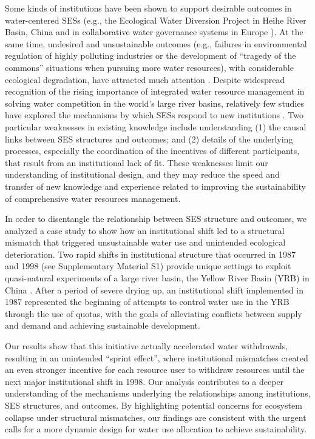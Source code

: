 \documentclass{nsr}
\begin{document}
Some kinds of institutions have been shown to support desirable outcomes in water-centered SESs (e.g., the Ecological Water Diversion Project in Heihe River Basin, China \cite{wangAlignmentsocialecological2019} and in collaborative water governance systems in Europe \cite{greenEUWaterGovernance2013}).
At the same time, undesired and unsustainable outcomes (e.g., failures in environmental regulation of highly polluting industries or the development of “tragedy of the commons” situations when pursuing more water resources), with considerable ecological degradation, have attracted much attention \cite{saylesSocialecologicalnetworkanalysis2019,caiPollutingthyneighbor2016,castilla-rhoSocialtippingpoints2017}.
Despite widespread recognition of the rising importance of integrated water resource management in solving water competition in the world’s large river basins, relatively few studies have explored the mechanisms by which SESs respond to new institutions \cite{agrawalSustainableGovernanceCommonPool2003,pershaSocialEcologicalSynergy2011,agrawalCommonPropertyInstitutions2001}.
Two particular weaknesses in existing knowledge include understanding (1) the causal links between SES structures and outcomes; and (2) details of the underlying processes, especially the coordination of the incentives of different participants, that result from an institutional lack of fit. These weaknesses limit our understanding of institutional design, and they may reduce the speed and transfer of new knowledge and experience related to improving the sustainability of comprehensive water resources management.

In order to disentangle the relationship between SES structure and outcomes, we analyzed a case study to show how an institutional shift led to a structural mismatch that triggered unsustainable water use and unintended ecological deterioration. Two rapid shifts in institutional structure that occurred in 1987 and 1998 (see Supplementary Material S1) provide unique settings to exploit quasi-natural experiments of a large river basin, the Yellow River Basin (YRB) in China \cite{xiaDevelopmentWaterAllocation2012}. After a period of severe drying up, an institutional shift implemented in 1987 represented the beginning of attempts to control water use in the YRB through the use of quotas, with the goals of alleviating conflicts between supply and demand and achieving sustainable development.

Our results show that this initiative actually accelerated water withdrawals, resulting in an unintended “sprint effect”, where institutional mismatches created an even stronger incentive for each resource user to withdraw resources until the next major institutional shift in 1998. Our analysis contributes to a deeper understanding of the mechanisms underlying the relationships among institutions, SES structures, and outcomes. By highlighting potential concerns for ecosystem collapse under structural mismatches, our findings are consistent with the urgent calls for a more dynamic design for water use allocation to achieve sustainability.
\end{document}
